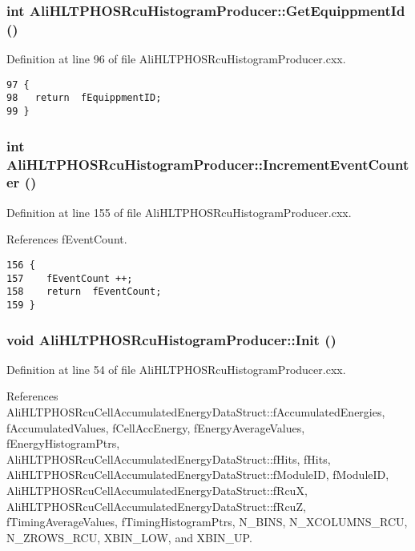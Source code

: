 \subsubsection{\setlength{\rightskip}{0pt plus 5cm}int Ali\-HLTPHOSRcu\-Histogram\-Producer::Get\-Equippment\-Id ()}\label{classAliHLTPHOSRcuHistogramProducer_a3}




Definition at line 96 of file Ali\-HLTPHOSRcu\-Histogram\-Producer.cxx.

\footnotesize\begin{verbatim}97 {
98   return  fEquippmentID;
99 }
\end{verbatim}\normalsize 


\subsubsection{\setlength{\rightskip}{0pt plus 5cm}int Ali\-HLTPHOSRcu\-Histogram\-Producer::Increment\-Event\-Counter ()}\label{classAliHLTPHOSRcuHistogramProducer_a5}




Definition at line 155 of file Ali\-HLTPHOSRcu\-Histogram\-Producer.cxx.

References f\-Event\-Count.

\footnotesize\begin{verbatim}156 {
157    fEventCount ++;
158    return  fEventCount;
159 }
\end{verbatim}\normalsize 


\subsubsection{\setlength{\rightskip}{0pt plus 5cm}void Ali\-HLTPHOSRcu\-Histogram\-Producer::Init ()}\label{classAliHLTPHOSRcuHistogramProducer_a6}




Definition at line 54 of file Ali\-HLTPHOSRcu\-Histogram\-Producer.cxx.

References Ali\-HLTPHOSRcu\-Cell\-Accumulated\-Energy\-Data\-Struct::f\-Accumulated\-Energies, f\-Accumulated\-Values, f\-Cell\-Acc\-Energy, f\-Energy\-Average\-Values, f\-Energy\-Histogram\-Ptrs, Ali\-HLTPHOSRcu\-Cell\-Accumulated\-Energy\-Data\-Struct::f\-Hits, f\-Hits, Ali\-HLTPHOSRcu\-Cell\-Accumulated\-Energy\-Data\-Struct::f\-Module\-ID, f\-Module\-ID, Ali\-HLTPHOSRcu\-Cell\-Accumulated\-Energy\-Data\-Struct::f\-Rcu\-X, Ali\-HLTPHOSRcu\-Cell\-Accumulated\-Energy\-Data\-Struct::f\-Rcu\-Z, f\-Timing\-Average\-Values, f\-Timing\-Histogram\-Ptrs, N\_\-BINS, N\_\-XCOLUMNS\_\-RCU, N\_\-ZROWS\_\-RCU, XBIN\_\-LOW, and XBIN\_\-UP.

